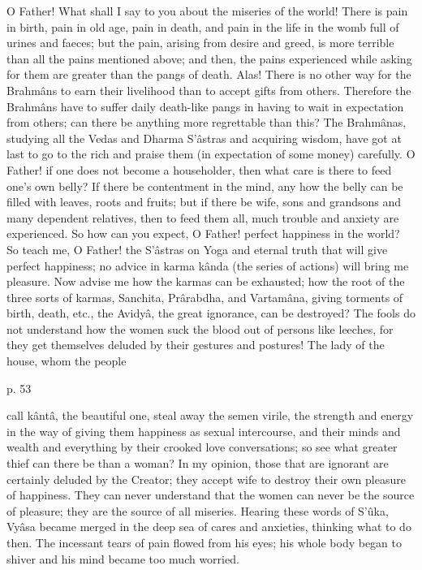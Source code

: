 O Father! What shall I say to you about the miseries of the world! There is pain in birth, pain in old age, pain in death, and pain in the life in the womb full of urines and faeces; but the pain, arising from desire and greed, is more terrible than all the pains mentioned above; and then, the pains experienced while asking for them are greater than the pangs of death. Alas! There is no other way for the Brahmâns to earn their livelihood than to accept gifts from others. Therefore the Brahmâns have to suffer daily death-like pangs in having to wait in expectation from others; can there be anything more regrettable than this? The Brahmânas, studying all the Vedas and Dharma S'âstras and acquiring wisdom, have got at last to go to the rich and praise them (in expectation of some money) carefully. O Father! if one does not become a householder, then what care is there to feed one's own belly? If there be contentment in the mind, any how the belly can be filled with leaves, roots and fruits; but if there be wife, sons and grandsons and many dependent relatives, then to feed them all, much trouble and anxiety are experienced. So how can you expect, O Father! perfect happiness in the world? So teach me, O Father! the S’âstras on Yoga and eternal truth that will give perfect happiness; no advice in karma kânda (the series of actions) will bring me pleasure. Now advise me how the karmas can be exhausted; how the root of the three sorts of karmas, Sanchita, Prârabdha, and Vartamâna, giving torments of birth, death, etc., the Avidyâ, the great ignorance, can be destroyed? The fools do not understand how the women suck the blood out of persons like leeches, for they get themselves deluded by their gestures and postures! The lady of the house, whom the people

 

p. 53

 

call kântâ, the beautiful one, steal away the semen virile, the strength and energy in the way of giving them happiness as sexual intercourse, and their minds and wealth and everything by their crooked love conversations; so see what greater thief can there be than a woman? In my opinion, those that are ignorant are certainly deluded by the Creator; they accept wife to destroy their own pleasure of happiness. They can never understand that the women can never be the source of pleasure; they are the source of all miseries. Hearing these words of S’ûka, Vyâsa became merged in the deep sea of cares and anxieties, thinking what to do then. The incessant tears of pain flowed from his eyes; his whole body began to shiver and his mind became too much worried.

